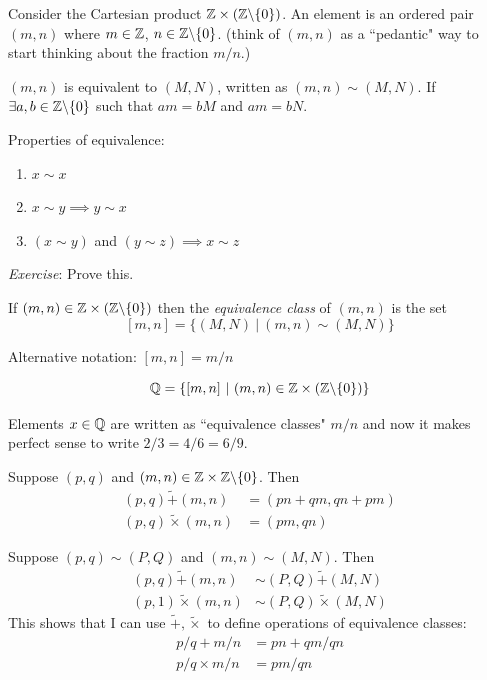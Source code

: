 \documentclass[10pt]{scrartcl}
\begin{document}
Consider the Cartesian product $\mathbb{Z} \times (\mathbb{Z} \backslash\{0\})$. An element is an ordered pair $(m,n)$ where $m \in \mathbb{Z}$, $n \in \mathbb{Z}\backslash\{0\}$. (think of $(m,n)$ as a ``pedantic" way to start thinking about the fraction $m/n$.)\\

\begin{definition}
$(m,n)$ is equivalent to $(M,N)$, written as $(m,n) \sim 	(M,N)$. If $\exists a,b \in \mathbb{Z}\backslash\{0\}$ such that $am = bM$ and $am = bN$. 
\end{definition}

Properties of equivalence: 
\begin{enumerate}
\item $x \sim x$
\item $x \sim y \implies y \sim x$
\item $(x\sim y)$ and $(y \sim z) \implies x \sim z$	
\end{enumerate}
\emph{Exercise}: Prove this.\\

\begin{definition}
If $(m,n) \in \mathbb{Z} \times (\mathbb{Z} \backslash\{0\})$ then the \emph{equivalence class} of $(m,n)$ is the set 
\[[m,n] = \{(M,N) ~|~ (m,n) \sim (M,N)\}\]
\end{definition}

Alternative notation: $[m,n] = m/n$\\

\begin{definition}
\[\mathbb{Q} = \{[m,n] ~|~ (m,n) \in \mathbb{Z} \times (\mathbb{Z} \backslash\{0\})\}\]	
\end{definition}
Elements $x \in\mathbb{Q}$ are written as ``equivalence classes" $m/n$ and now it makes perfect sense to write $2/3 = 4/6 = 6/9$.

Suppose $(p,q)$ and $(m,n) \in \mathbb{Z} \times \mathbb{Z}\backslash\{0\}$. Then 
\[
\begin{aligned}
  (p,q) \widetilde{+} (m,n) &= (pn + qm, qn + pm)\\
  (p,q) \widetilde{\times} (m,n) &= (pm, qn)
\end{aligned}
\]


Suppose $(p,q) \sim (P,Q)$ and $(m,n) \sim (M,N)$. Then
\[
\begin{aligned}
  (p,q) \widetilde{+} (m,n) &\sim (P,Q) \widetilde{+} (M,N)\\
  (p,1) \widetilde{\times} (m,n) &\sim (P,Q) \widetilde{\times} (M,N)
\end{aligned}
\]
This shows that I can use $\widetilde{+}, \widetilde{\times}$ to define operations of equivalence classes: 
\[
\begin{aligned}
  p/q + m/n &= pn + qm/qn\\
  p/q \times m/n &= pm / qn
\end{aligned}
\]
\end{document}
